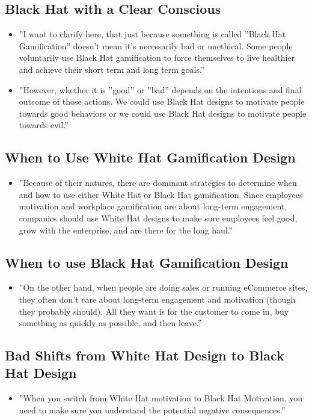 \subsection{Black Hat with a Clear Conscious}
\begin{itemize}
    \item ''I want to clarify here, that just because something is called ''Black Hat Gamification'' doesn't mean it's necessarily bad or unethical. Some people voluntarily use Black Hat gamification to force themselves to live healthier and achieve their short term and long term goals.''
    \item ''However, whether it is ''good'' or ''bad'' depends on the intentions and final outcome of those actions. We could use Black Hat designs to motivate people towards good behaviors or we could use Black Hat designs to motivate people towards evil.''
\end{itemize}

\subsection{When to Use White Hat Gamification Design}
\begin{itemize}
    \item ''Because of their natures, there are dominant strategies to determine when and how to use either White Hat or Black Hat gamification. Since employees motivation and workplace gamification are about long-term engagement, companies should use White Hat designs to make sure employees feel good, grow with the enterprise, and are there for the long haul.''
\end{itemize}

\subsection{When to use Black Hat Gamification Design}
\begin{itemize}
    \item ''On the other hand, when people are doing sales or running eCommerce sites, they often don't care about long-term engagement and motivation (though they probably should). All they want is for the customer to come in, buy something as quickly as possible, and then leave.''
\end{itemize}

\subsection{Bad Shifts from White Hat Design to Black Hat Design}
\begin{itemize}
    \item ''When you switch from White Hat motivation to Black Hat Motivation, you need to make sure you understand the potential negative consequences.''
\end{itemize}

